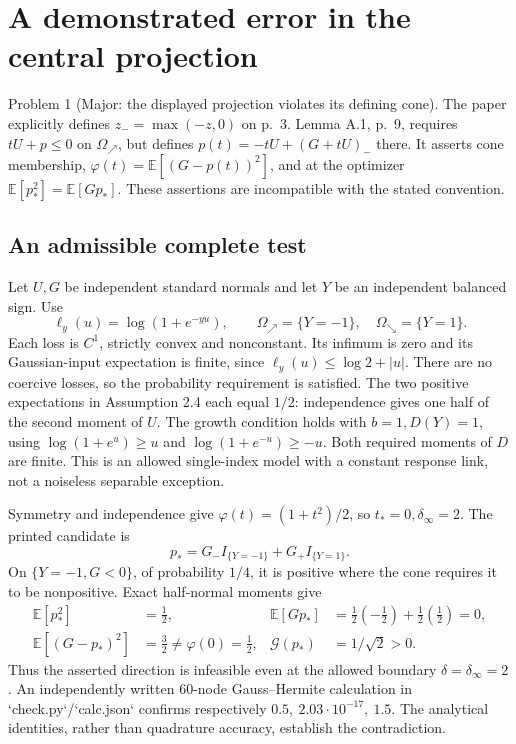 \documentclass[10pt]{article}
\begin{document}
\section*{A demonstrated error in the central projection}
Problem 1 (Major: the displayed projection violates its defining cone).  The paper explicitly defines \(z_-=\max(-z,0)\) on p. 3. Lemma A.1, p. 9, requires \(tU+p\leq0\) on \(\Omega_\nearrow\), but defines \(p(t)=-tU+(G+tU)_-\) there. It asserts cone membership, \(\varphi(t)=\mathbb E[(G-p(t))^2]\), and at the optimizer \(\mathbb E[p_*^2]=\mathbb E[Gp_*]\). These assertions are incompatible with the stated convention.\par
\subsection*{An admissible complete test}
Let \(U,G\) be independent standard normals and let \(Y\) be an independent balanced sign. Use \[\ell_y(u)=\log(1+e^{-yu}),\qquad
\Omega_\nearrow=\{Y=-1\},\quad\Omega_\searrow=\{Y=1\}.\] Each loss is \(C^1\), strictly convex and nonconstant. Its infimum is zero and its Gaussian-input expectation is finite, since \(\ell_y(u)\leq\log2+|u|\). There are no coercive losses, so the probability requirement is satisfied. The two positive expectations in Assumption 2.4 each equal \(1/2\): independence gives one half of the second moment of \(U\). The growth condition holds with \(b=1,D(Y)=1\), using \(\log(1+e^u)\geq u\) and \(\log(1+e^{-u})\geq-u\). Both required moments of \(D\) are finite. This is an allowed single-index model with a constant response link, not a noiseless separable exception.\par
Symmetry and independence give \(\varphi(t)=(1+t^2)/2\), so \(t_*=0,\delta_\infty=2\). The printed candidate is \[p_*=G_-I_{\{Y=-1\}}+G_+I_{\{Y=1\}}.\] On \(\{Y=-1,G<0\}\), of probability \(1/4\), it is positive where the cone requires it to be nonpositive. Exact half-normal moments give \[\begin{aligned}
\mathbb E[p_*^2]&=\tfrac12,&
\mathbb E[Gp_*]&=\tfrac12(-\tfrac12)+\tfrac12(\tfrac12)=0,\\
\mathbb E[(G-p_*)^2]&=\tfrac32\ne\varphi(0)=\tfrac12,&
\mathcal G(p_*)&=1/\sqrt2>0.\end{aligned}\] Thus the asserted direction is infeasible even at the allowed boundary \(\delta=\delta_\infty=2\). An independently written 60-node Gauss–Hermite calculation in `check.py`/`calc.json` confirms respectively \(0.5,\ 2.03\cdot10^{-17},\ 1.5\). The analytical identities, rather than quadrature accuracy, establish the contradiction.\par
\end{document}
